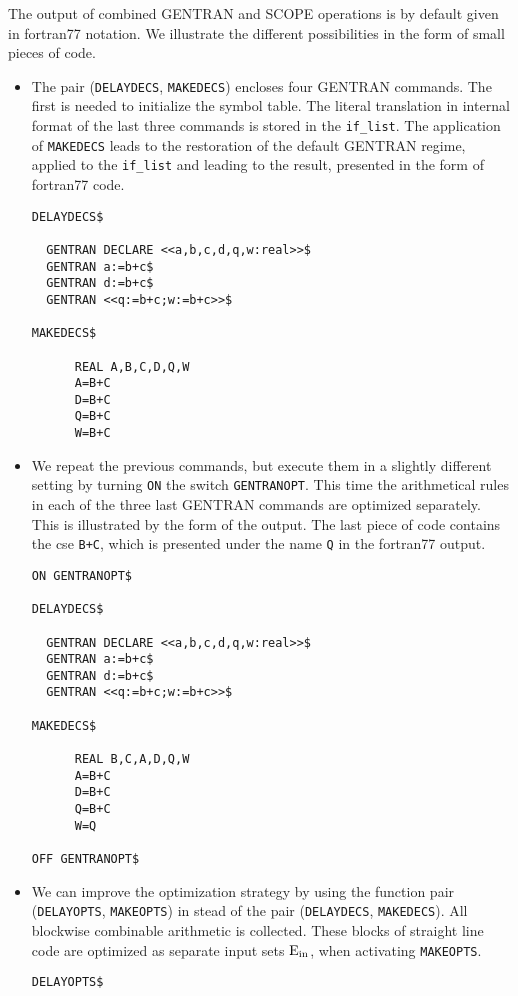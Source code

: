 \example\label{ex:8.1}

The output of combined GENTRAN and SCOPE operations is by default given
in fortran77 notation. We illustrate the different possibilities in the
form of small pieces of code.
\begin{itemize}
\item The pair ({\tt DELAYDECS}, {\tt MAKEDECS}) encloses four GENTRAN commands.
The first is needed to initialize the symbol table. The literal translation in
internal format of the last three commands is stored in the {\tt if\_list}.
The application of {\tt MAKEDECS} leads to the restoration of the default
GENTRAN regime, applied to the {\tt if\_list} and leading to the result,
presented in the form of fortran77 code.
{\small
\begin{verbatim}
DELAYDECS$

  GENTRAN DECLARE <<a,b,c,d,q,w:real>>$
  GENTRAN a:=b+c$
  GENTRAN d:=b+c$
  GENTRAN <<q:=b+c;w:=b+c>>$

MAKEDECS$

      REAL A,B,C,D,Q,W
      A=B+C
      D=B+C
      Q=B+C
      W=B+C
\end{verbatim}}
\item We repeat the previous commands, but execute them in a slightly different
setting by turning {\tt ON} the switch {\tt GENTRANOPT}. This time the
arithmetical rules in each of the three last GENTRAN commands are optimized
separately.  This is illustrated by the form of the output. The last piece of
code contains the cse {\tt B+C}, which is presented under the name {\tt Q}
in the fortran77 output.
{\small
\begin{verbatim}
ON GENTRANOPT$

DELAYDECS$

  GENTRAN DECLARE <<a,b,c,d,q,w:real>>$
  GENTRAN a:=b+c$
  GENTRAN d:=b+c$
  GENTRAN <<q:=b+c;w:=b+c>>$

MAKEDECS$

      REAL B,C,A,D,Q,W
      A=B+C
      D=B+C
      Q=B+C
      W=Q

OFF GENTRANOPT$
\end{verbatim}}
\item We can improve the optimization strategy by using the function pair
({\tt DELAYOPTS}, {\tt MAKEOPTS}) in stead of the
pair ({\tt DELAYDECS}, {\tt MAKEDECS}). All blockwise combinable arithmetic
is collected. These blocks of straight line code are optimized as separate
input sets ${\rm E_{in}}$, when activating {\tt MAKEOPTS}.
{\small
\begin{verbatim}
DELAYOPTS$


\end{verbatim}}
\end{itemize}
